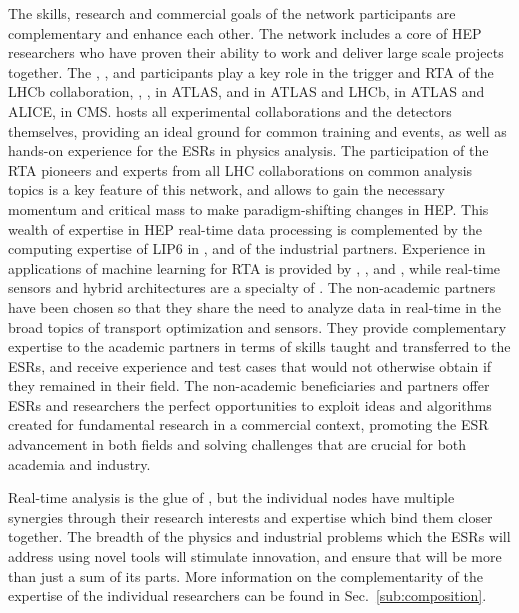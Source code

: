 The skills, research and commercial goals of the network participants are
complementary and enhance each other. The \acronym network includes a core of HEP researchers who have proven their ability to work
and deliver large scale projects together. 
The \cnrsentity, \dortmundentity, \santiagoentity and \cincinnatientity participants play a key role in the trigger
and RTA of the LHCb collaboration, 
\ohioentity, \pisaentity, \oregonentity in ATLAS, \nikhef and \heidelbergentity in ATLAS and LHCb, 
\lundentity in ATLAS and ALICE, \helsinkientity in CMS.
\cernentity hosts all experimental collaborations and the detectors themselves,
providing an ideal ground for common training and events, as well as hands-on
experience for the ESRs in physics analysis. 
The participation of the RTA pioneers and experts from all LHC collaborations on 
common analysis topics is a key feature of this network, and allows to gain
the necessary momentum and critical mass to make paradigm-shifting changes in HEP. 
This wealth of expertise in HEP real-time data processing
is complemented by the computing expertise of LIP6 in \cnrsentity, \cincinnatientity
and of the industrial partners.  
Experience in applications of machine learning for RTA
is provided by \ibmentity, \fleetmaticsentity,
\ximantisentity and \dqentity, while real-time sensors and hybrid architectures
are a specialty of \lightboxentity. 
The non-academic partners have been chosen so that they share the need to analyze data
in real-time in the broad topics of transport optimization and sensors.
They provide complementary expertise to the academic partners in terms of skills taught and
transferred to the ESRs, and receive experience and test cases that would not otherwise
obtain if they remained in their field. 
The non-academic beneficiaries and partners
offer ESRs and researchers the perfect opportunities to exploit
ideas and algorithms created for fundamental research in a commercial context, promoting the ESR 
advancement in both fields and solving challenges that are crucial for both academia and industry. 

Real-time analysis is the glue of \acronym, but the individual nodes have multiple synergies through their research
interests and expertise which bind them closer together. The breadth
of the physics and industrial problems which the ESRs will address using novel tools will
stimulate innovation, %
and ensure that \acronym will
be more than just a sum of its parts. More information on the complementarity of the expertise of the
individual researchers can be found in Sec.~\ref{sub:composition}. 

